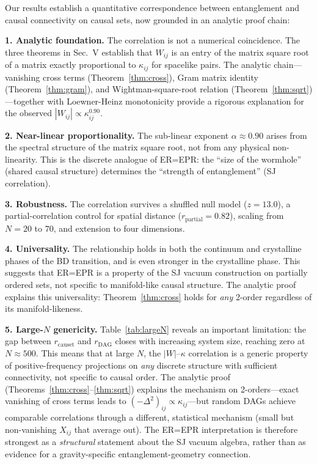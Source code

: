 \documentclass[aps,prd,twocolumn,superscriptaddress,nofootinbib]{revtex4-2}
\begin{document}
Our results establish a quantitative correspondence between entanglement and causal connectivity on causal sets, now grounded in an analytic proof chain:

\textbf{1. Analytic foundation.} The correlation is not a numerical coincidence. The three theorems in Sec.~V establish that $W_{ij}$ is an entry of the matrix square root of a matrix exactly proportional to $\kappa_{ij}$ for spacelike pairs. The analytic chain---vanishing cross terms (Theorem~\ref{thm:cross}), Gram matrix identity (Theorem~\ref{thm:gram}), and Wightman-square-root relation (Theorem~\ref{thm:sqrt})---together with Loewner-Heinz monotonicity provide a rigorous explanation for the observed $|W_{ij}| \propto \kappa_{ij}^{0.90}$.

\textbf{2. Near-linear proportionality.} The sub-linear exponent $\alpha \approx 0.90$ arises from the spectral structure of the matrix square root, not from any physical non-linearity. This is the discrete analogue of ER=EPR: the ``size of the wormhole'' (shared causal structure) determines the ``strength of entanglement'' (SJ correlation).

\textbf{3. Robustness.} The correlation survives a shuffled null model ($z = 13.0$), a partial-correlation control for spatial distance ($r_{\text{partial}} = 0.82$), scaling from $N = 20$ to $70$, and extension to four dimensions.

\textbf{4. Universality.} The relationship holds in both the continuum and crystalline phases of the BD transition, and is even stronger in the crystalline phase. This suggests that ER=EPR is a property of the SJ vacuum construction on partially ordered sets, not specific to manifold-like causal structure. The analytic proof explains this universality: Theorem~\ref{thm:cross} holds for \emph{any} 2-order regardless of its manifold-likeness.

\textbf{5. Large-$N$ genericity.} Table~\ref{tab:largeN} reveals an important limitation: the gap between $r_{\text{causet}}$ and $r_{\text{DAG}}$ closes with increasing system size, reaching zero at $N \approx 500$. This means that at large $N$, the $|W|$--$\kappa$ correlation is a generic property of positive-frequency projections on \emph{any} discrete structure with sufficient connectivity, not specific to causal order. The analytic proof (Theorems~\ref{thm:cross}--\ref{thm:sqrt}) explains the mechanism on 2-orders---exact vanishing of cross terms leads to $(-\Delta^2)_{ij} \propto \kappa_{ij}$---but random DAGs achieve comparable correlations through a different, statistical mechanism (small but non-vanishing $X_{ij}$ that average out). The ER=EPR interpretation is therefore strongest as a \emph{structural} statement about the SJ vacuum algebra, rather than as evidence for a gravity-specific entanglement-geometry connection.
\end{document}
